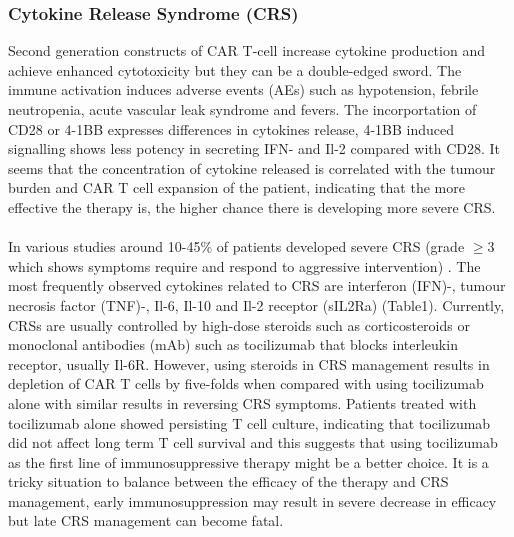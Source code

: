 \documentclass[12pt,oneside]{report}
\begin{document}
\subsubsection{Cytokine Release Syndrome (CRS)} 
Second generation constructs of CAR T-cell increase cytokine production and achieve enhanced cytotoxicity but they can be a double-edged sword. The immune activation induces adverse events (AEs) such as hypotension, febrile neutropenia, acute vascular leak syndrome and fevers\citep{cyto-1}. The incorportation of CD28 or 4-1BB expresses differences in cytokines release, 4-1BB induced signalling shows less potency in secreting IFN-\textalpha{} and Il-2 compared with CD28\citep{cyto-9}. It seems that the concentration of cytokine released is correlated with the tumour burden and CAR T cell expansion of the patient\cite{acute2, cyto-2}, indicating that the more effective the therapy is, the higher chance there is developing more severe CRS.  
\\\\In various studies around 10-45\% of patients developed severe CRS (grade $\geq$3 which shows symptoms require and respond to aggressive intervention) \citep{cyto-3, cyto-4, cyto-5, cyto-6, cyto-7, cyto-8}. The most frequently observed cytokines related to CRS are interferon (IFN)-\textgamma, tumour necrosis factor (TNF)-\textalpha, Il-6, Il-10 and Il-2 receptor \textalpha{} (sIL2Ra) (Table1). Currently, CRSs are usually controlled by high-dose steroids such as corticosteroids or monoclonal antibodies (mAb) such as tocilizumab that blocks interleukin receptor, usually Il-6R\citep{ALL}. However, using steroids in CRS management results in depletion of CAR T cells by five-folds when compared with using tocilizumab alone with similar results in reversing CRS symptoms\citep{ALL}. Patients treated with tocilizumab alone showed persisting T cell culture, indicating that tocilizumab did not affect long term T cell survival\citep{chronic} and this suggests that using tocilizumab as the first line of immunosuppressive therapy might be a better choice. It is a tricky situation to balance between the efficacy of the therapy and CRS management, early immunosuppression may result in severe decrease in efficacy but late CRS management can become fatal.  
\end{document}

